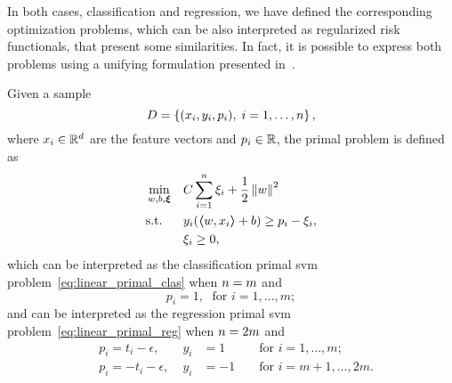 In both cases, classification and regression, we have defined the corresponding optimization problems, which can be also interpreted as regularized risk functionals, that present some similarities. In fact, it is possible to express both problems using a unifying formulation presented in~\cite{Lin01}.
\begin{definition}
    Given a sample
    $$ D = \left\{(x_i, y_i, p_i), \; i=1, \ldots, n\right\} ,$$
    where $x_i \in \mathbb{R}^d$ are the feature vectors and $p_i \in \mathbb{R}$, 
    the primal problem is defined as
    \begin{equation}
        \label{eq:linear_primal}
        \begin{aligned}
            &\min_{w, b, \fv{\xi}} & & C \sum_{i=1}^\nsamples \xi_i + \frac{1}{2} \norm{w}^2 \\
            & \text{s.t.} & & y_i (\dotp{w}{x_i} + b) \geq p_i - \xi_i , \\
            & & & \xi_i \geq 0 ,      
        \end{aligned}  
    \end{equation}
    which can be interpreted as the classification primal \acrshort{svm} problem~\eqref{eq:linear_primal_clas} when $n=m$ and
    $$ p_i = 1,\; \text{ for } i=1, \ldots, m ;$$
    and can be interpreted as the regression primal \acrshort{svm} problem~\eqref{eq:linear_primal_reg} when $n = 2 m$ and
    \begin{equation}
        \nonumber
        \begin{aligned}
            & p_i = t_i - \epsilon ,\; &y_i &= 1 &&\text{ for } i=1, \ldots, m ; \\
            & p_i = -t_i - \epsilon ,\; &y_i &= -1 &&\text{ for } i=m+1, \ldots, 2m .
        \end{aligned}
    \end{equation}
\end{definition}
%
